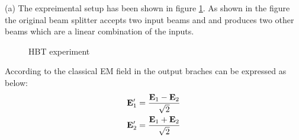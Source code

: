 \begin{homeworkProblem}
\begin{homeworkSection}{(a)}
The expreimental setup has been shown in figure \ref{fig-HBT}. As shown in the figure the original beam splitter accepts two input beams and and produces two other beams which are a linear combination of the inputs.  
\begin{figure}[!h]
\centering

\caption{\small HBT experiment}
\label{fig-HBT}
\end{figure} 
According to \cite{fox} the classical EM field in the output braches can be expressed as below:
\begin{align}
&\mathbf{E}'_1=\frac{\mathbf{E}_1-\mathbf{E}_2}{\sqrt{2}}\\
&\mathbf{E}'_2=\frac{\mathbf{E}_1+\mathbf{E}_2}{\sqrt{2}}
\end{align}


\end{homeworkSection}
\end{homeworkProblem}
